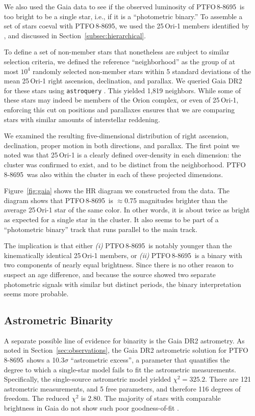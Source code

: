 \documentclass[12pt,twocolumn,tighten]{aastex62}
\newcommand{\ptfo}{PTFO$\,$8-8695}
\begin{document}
We also used the Gaia data to see if the observed luminosity of \ptfo\ 
is too bright to be a single star, i.e., if it is a ``photometric
binary.'' To assemble a set of stars coeval with \ptfo, we used the
25$\,$Ori-1 members identified by \citet{kounkel_apogee2_2018}, and
discussed in Section~\ref{subsec:hierarchical}.

To define a set of non-member stars that nonetheless are subject to
similar selection criteria, we defined the reference ``neighborhood''
as the group of at most $10^4$ randomly selected non-member stars
within 5 standard deviations of the mean 25$\,$Ori-1 right ascension,
declination, and parallax.  We queried Gaia DR2 for these stars using
\texttt{astroquery} \citep{astroquery_2018}.  This yielded 1{,}819
neighbors.  While some of these stars may indeed be members of the
Orion complex, or even of 25$\,$Ori-1, enforcing this cut on positions
and parallaxes ensures that we are comparing stars with similar
amounts of interstellar reddening.

We examined the resulting five-dimensional distribution of right
ascension, declination, proper motion in both directions, and
parallax.  The first point we noted was that 25$\,$Ori-1 is a clearly
defined over-density in each dimension: the cluster was confirmed to
exist, and to be distinct from the neighborhood. \ptfo\ was also
within the cluster in each of these projected dimensions.

Figure~\ref{fig:gaia} shows the HR diagram we constructed from the
data.  The diagram shows that \ptfo\ is $\approx$0.75 magnitudes
brighter than the average 25$\,$Ori-1 star of the same color.  In
other words, it is about twice as bright as expected for a single star
in the cluster.  It also seems to be part of a ``photometric binary''
track that runs parallel to the main track.

The implication is that either {\it (i)} \ptfo\ is notably younger
than the kinematically identical 25$\,$Ori-1 members, or {\it (ii)}
\ptfo\ is a binary with two components of nearly equal brightness.
Since there is no other reason to suspect an age difference, and
because the source showed two separate photometric signals with
similar but distinct periods, the binary interpretation seems more
probable.

\subsection{Astrometric Binarity}

A separate possible line of evidence for binarity is the Gaia DR2
astrometry.  As noted in Section~\ref{sec:observations}, the Gaia DR2
astrometric solution for \ptfo\ shows a 10.3$\sigma$ ``astrometric
excess'', a parameter that quantifies the degree to which a
single-star model fails to fit the astrometric measurements.
Specifically, the single-source astrometric model yielded
$\chi^2=325.2$.  There are 121 astrometric measurements, and 5 free
parameters, and therefore 116 degrees of freedom. The reduced $\chi^2$
is 2.80.  The majority of stars with comparable brightness in Gaia do
not show such poor goodness-of-fit \citep[see][Appendix
A]{lindegren_gaiasoln_2018}.
\end{document}
